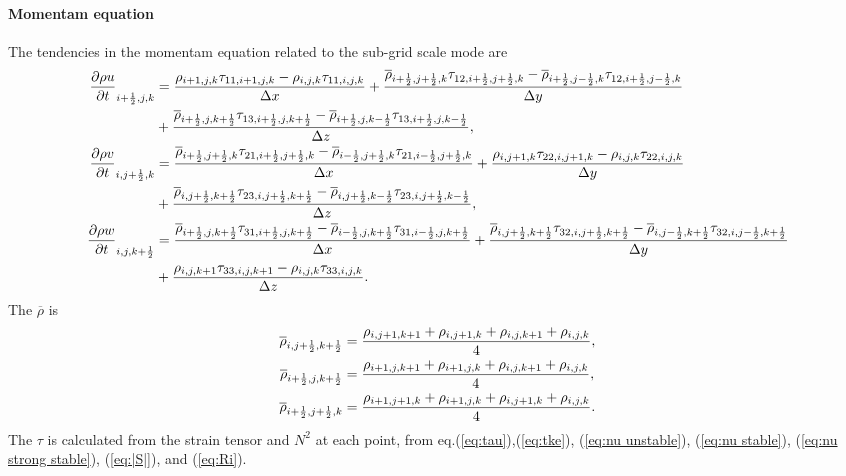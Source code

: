 \paragraph{Momentam equation}
The tendencies in the momentam equation related to the sub-grid scale mode are
\begin{align}
  \frac{\partial \rho u}{\partial t}_{i+\frac{1}{2},j,k} &=
    \frac{\rho_{i+1,j,k}\tau_{11,i+1,j,k}-\rho_{i,j,k}\tau_{11,i,j,k}}{\Delta x}
  + \frac{\overline{\rho}_{i+\frac{1}{2},j+\frac{1}{2},k}\tau_{12,i+\frac{1}{2},j+\frac{1}{2},k}-\overline{\rho}_{i+\frac{1}{2},j-\frac{1}{2},k}\tau_{12,i+\frac{1}{2},j-\frac{1}{2},k}}{\Delta y} \nonumber \\
  &+ \frac{\overline{\rho}_{i+\frac{1}{2},j,k+\frac{1}{2}}\tau_{13,i+\frac{1}{2},j,k+\frac{1}{2}}-\overline{\rho}_{i+\frac{1}{2},j,k-\frac{1}{2}}\tau_{13,i+\frac{1}{2},j,k-\frac{1}{2}}}{\Delta z}, \\
  \frac{\partial \rho v}{\partial t}_{i,j+\frac{1}{2},k} &=
    \frac{\overline{\rho}_{i+\frac{1}{2},j+\frac{1}{2},k}\tau_{21,i+\frac{1}{2},j+\frac{1}{2},k}-\overline{\rho}_{i-\frac{1}{2},j+\frac{1}{2},k}\tau_{21,i-\frac{1}{2},j+\frac{1}{2},k}}{\Delta x}
  + \frac{\rho_{i,j+1,k}\tau_{22,i,j+1,k}-\rho_{i,j,k}\tau_{22,i,j,k}}{\Delta y} \nonumber \\
 &+ \frac{\overline{\rho}_{i,j+\frac{1}{2},k+\frac{1}{2}}\tau_{23,i,j+\frac{1}{2},k+\frac{1}{2}}-\overline{\rho}_{i,j+\frac{1}{2},k-\frac{1}{2}}\tau_{23,i,j+\frac{1}{2},k-\frac{1}{2}}}{\Delta z}, \\
  \frac{\partial \rho w}{\partial t}_{i,j,k+\frac{1}{2}} &=
    \frac{\overline{\rho}_{i+\frac{1}{2},j,k+\frac{1}{2}}\tau_{31,i+\frac{1}{2},j,k+\frac{1}{2}}-\overline{\rho}_{i-\frac{1}{2},j,k+\frac{1}{2}}\tau_{31,i-\frac{1}{2},j,k+\frac{1}{2}}}{\Delta x}
  + \frac{\overline{\rho}_{i,j+\frac{1}{2},k+\frac{1}{2}}\tau_{32,i,j+\frac{1}{2},k+\frac{1}{2}}-\overline{\rho}_{i,j-\frac{1}{2},k+\frac{1}{2}}\tau_{32,i,j-\frac{1}{2},k+\frac{1}{2}}}{\Delta y} \nonumber \\
 &+ \frac{\rho_{i,j,k+1}\tau_{33,i,j,k+1}-\rho_{i,j,k}\tau_{33,i,j,k}}{\Delta z}.
\end{align}
The $\overline{\rho}$ is
\begin{align}
  \overline{\rho}_{i,j+\frac{1}{2},k+\frac{1}{2}} &=
  \frac{\rho_{i,j+1,k+1} + \rho_{i,j+1,k} + \rho_{i,j,k+1} + \rho_{i,j,k}}{4}, \\
  \overline{\rho}_{i+\frac{1}{2},j,k+\frac{1}{2}} &=
  \frac{\rho_{i+1,j,k+1} + \rho_{i+1,j,k} + \rho_{i,j,k+1} + \rho_{i,j,k}}{4}, \\
  \overline{\rho}_{i+\frac{1}{2},j+\frac{1}{2},k} &=
  \frac{\rho_{i+1,j+1,k} + \rho_{i+1,j,k} + \rho_{i,j+1,k} + \rho_{i,j,k}}{4}.
\end{align}
The $\tau$ is calculated from the strain tensor and $N^2$ at each point,
from eq.(\ref{eq:tau}),(\ref{eq:tke}), (\ref{eq:nu unstable}), (\ref{eq:nu stable}), (\ref{eq:nu strong stable}), (\ref{eq:|S|}), and (\ref{eq:Ri}).

